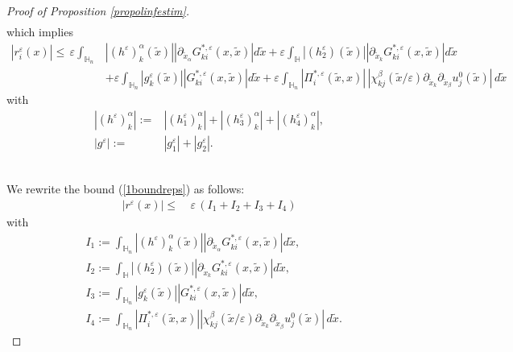 \documentclass[11pt, reqno]{amsart}
\theoremstyle{definition}
\theoremstyle{remark}
\numberwithin{equation}{section}
\begin{document}
\begin{proof}[Proof of Proposition \textup{\ref{propolinfestim}}]
\begin{align*}
		\end{align*}
		which implies 
		\begin{align}
			|r_i^\varepsilon(x)|\leq  \, \varepsilon \!\int_{\mathbb{H}_n} &   \left|(h^\varepsilon)^\alpha_k(\tilde{x})\right| \left|\partial_{\tilde{x}_\alpha} G_{ki}^{*,\varepsilon} (x,\tilde{x})\right|    d\tilde{x}+  \varepsilon \!\int_ \mathbb{H} \left|(h_2^\varepsilon)(\tilde{x})\right|\left|\partial_{\tilde{x}_k} G_{ki}^{*,\varepsilon} (x,\tilde{x})\right|  d\tilde{x}  \nonumber\\
			&+  \varepsilon \int_{\mathbb{H}_n}|g_k^\varepsilon(\tilde{x})|  \left|G_{ki}^{*,\varepsilon} (x,\tilde{x})\right| 
			d\tilde{x}+\varepsilon\int_{\mathbb{H}_n} \left|\Pi_i^{*,\varepsilon}(\tilde{x} ,x)\right|\, \left|\chi^{\beta}_{kj}(\tilde{x}/\varepsilon) \partial_{\tilde{x}_k}\partial_{\tilde{x}_{\beta}} u^0_j   (\tilde{x})\right| \,d\tilde{x}\label{1boundreps}
		\end{align}
		with 	
		\begin{align}
			|(h^\varepsilon)^\alpha_k|:=& |(h^\varepsilon_1)_k^\alpha|
			+  |(h^\varepsilon_3)^\alpha_k| + 	|(h_4^\varepsilon)_k^\alpha|, \label{def_heps}\\
			|g^\varepsilon|:=& |g^\varepsilon_1|+	|g^\varepsilon_2|\nonumber.
		\end{align}	
		
		\\
		We rewrite the bound (\ref{1boundreps}) as follows:
		\begin{align}
			|r^\varepsilon(x)|\leq 
			& \: \varepsilon \,(I_1 +I_2+ I_3+I_4) \label{repsIk}
		\end{align}
		with
		\begin{align*}
			&	I_1:= \!\int_{\mathbb{H}_n}  |(h^\varepsilon)^\alpha_k(\tilde{x})|\left|\partial_{\tilde{x}_\alpha}G_{ki}^{*,\varepsilon} (x,\tilde{x})\right|    d\tilde{x},\\ &I_2 :=\!\int_ \mathbb{H} |(h_2^\varepsilon)(\tilde{x})|\left|\partial_{\tilde{x}_k} G_{ki}^{*,\varepsilon} (x,\tilde{x})\right|  d\tilde{x},  \nonumber\\
			&I_3:=\int_{\mathbb{H}_n}|g_k^\varepsilon(\tilde{x})|  \left|G_{ki}^{*,\varepsilon} (x,\tilde{x})\right| 
			d\tilde{x},\\&I_4:=\int_{\mathbb{H}_n} \left|\Pi_i^{*,\varepsilon}(\tilde{x} ,x)\right| \left|\chi^{\beta}_{kj}(\tilde{x}/\varepsilon)\partial_{\tilde{x}_k}\partial_{\tilde{x}_\beta} u^0_j   (\tilde{x})\right| \,d\tilde{x}.
		\end{align*}
		

\end{proof}
\end{document}
